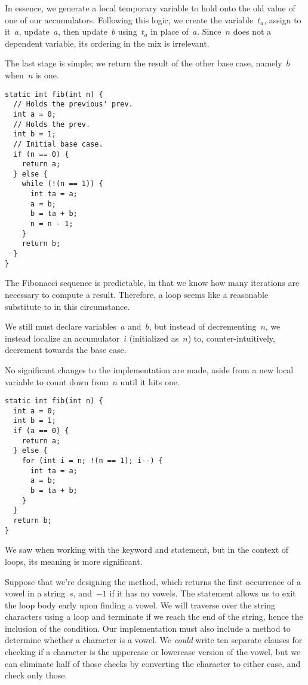 In essence, we generate a local temporary variable to hold onto the old value of one of our accumulators. 
Following this logic, we create the variable~$t_a$, assign to it~$a$, update~$a$, then update~$b$ using~$t_a$ in place of~$a$. 
Since~$n$ does not a dependent variable, its ordering in the mix is irrelevant.

The last stage is simple; we return the result of the other base case, namely~$b$ when~$n$ is one.

\begin{lstlisting}[language=MyJava]
static int fib(int n) {
  // Holds the previous' prev.
  int a = 0;
  // Holds the prev.
  int b = 1;
  // Initial base case.
  if (n == 0) {
    return a;
  } else {
    while (!(n == 1)) {
      int ta = a;
      a = b;
      b = ta + b;
      n = n - 1;
    }
    return b;
  }
}
\end{lstlisting}

The Fibonacci sequence is predictable, in that we know how many iterations are necessary to compute a result. 
Therefore, a  loop seems like a reasonable substitute to  in this circumstance. 

We still must declare variables~$a$ and~$b$, but instead of decrementing~$n$, we instead localize an accumulator~$i$ (initialized as~$n$) to, counter-intuitively, decrement towards the base case. 

No significant changes to the implementation are made, aside from a new local variable to count down from~$n$ until it hits one.

\enlargethispage{-2\baselineskip}
\begin{lstlisting}[language=MyJava]
static int fib(int n) {
  int a = 0;
  int b = 1;
  if (a == 0) {
    return a;
  } else {
    for (int i = n; !(n == 1); i--) {
      int ta = a;
      a = b;
      b = ta + b;
    }
  }
  return b;
}
\end{lstlisting}

We saw  when working with the  keyword and statement, but in the context of loops, its meaning is more significant. 

Suppose that we're designing the  method, which returns the first occurrence of a vowel in a string~$s$, and~$-1$ if it has no vowels. 
The  statement allows us to exit the loop body early upon finding a vowel. 
We will traverse over the string characters using a  loop and terminate if we reach the end of the string, hence the inclusion of the  condition. 
Our implementation must also include a method to determine whether a character is a vowel. 
We \emph{could} write ten separate clauses for checking if a character is the uppercase or lowercase version of the vowel, but we can eliminate half of those checks by converting the character to either case, and check only those.

